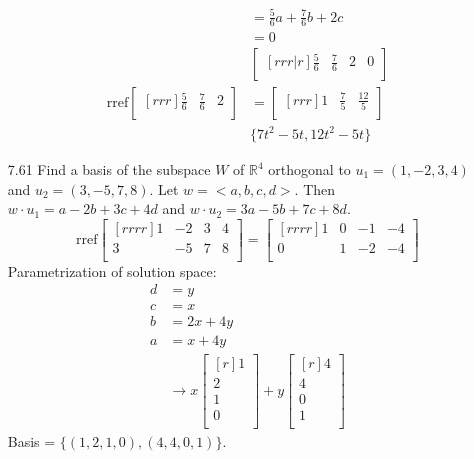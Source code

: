 \documentclass[12pt]{article}
\theoremstyle{definition}
\theoremstyle{plain}
\begin{document}
\begin{enumerate}
\begin{align*}
	&= \frac{5}{6}a+\frac{7}{6}b+2c\\
	&= 0\\
	&\begin{bmatrix}[rrr|r]\frac{5}{6}&\frac{7}{6}&2&0\\\end{bmatrix}\\
	\mathrm{rref}\begin{bmatrix}[rrr]\frac{5}{6}&\frac{7}{6}&2\\\end{bmatrix} &= \begin{bmatrix}[rrr]1&\frac{7}{5}&\frac{12}{5}\\\end{bmatrix}\\
	&\{7t^2-5t,12t^2-5t\}
	\end{align*}
\pagebreak
\item[7.61]Find a basis of the subspace $W$ of $\mathbb{R}^4$ orthogonal to $u_1=(1,-2,3,4)$ and $u_2=(3,-5,7,8)$.
	Let $w=<a,b,c,d>$. Then $w\cdot u_1 = a-2b+3c+4d$ and $w\cdot u_2=3a-5b+7c+8d$.\\
	\[ \mathrm{rref}\begin{bmatrix}[rrrr]1&-2&3&4\\3&-5&7&8\\\end{bmatrix} = \begin{bmatrix}[rrrr]1&0&-1&-4\\0&1&-2&-4\\\end{bmatrix} \]
	Parametrization of solution space:\\
	\begin{align*}
	d&=y\\
	c&=x\\
	b&=2x+4y\\
	a&=x+4y\\
	&\rightarrow x\begin{bmatrix}[r]1\\2\\1\\0\\\end{bmatrix} + y\begin{bmatrix}[r]4\\4\\0\\1\\\end{bmatrix}
	\end{align*}
	Basis = $\{(1,2,1,0),(4,4,0,1)\}$.

\end{enumerate}
\end{document}

